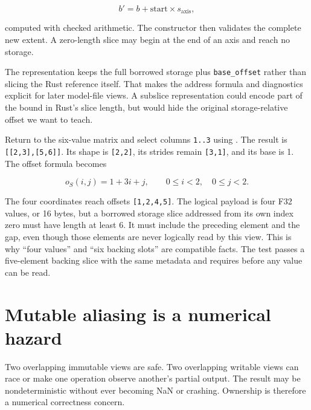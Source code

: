 \begin{equation}
b' = b + \text{start}\times s_{\text{axis}},
\end{equation}

computed with checked arithmetic. The constructor then validates the
complete new extent. A zero-length slice may begin at the end of an axis
and reach no storage.

The representation keeps the full borrowed storage plus
\texttt{base\_offset} rather than slicing the Rust reference itself.
That makes the address formula and diagnostics explicit for later
model-file views. A subslice representation could encode part of the
bound in Rust's slice length, but would hide the original
storage-relative offset we want to teach.


Return to the six-value matrix and select columns \texttt{1..3} using
\texttt{}. The result is
\texttt{{[}{[}2,3{]},{[}5,6{]}{]}}. Its shape is \texttt{{[}2,2{]}}, its
strides remain \texttt{{[}3,1{]}}, and its base is 1. The offset formula
becomes

\begin{equation}
o_S(i,j)=1+3i+j,\qquad 0\le i<2,\quad 0\le j<2.
\end{equation}

The four coordinates reach offsets \texttt{{[}1,2,4,5{]}}. The logical
payload is four F32 values, or 16 bytes, but a borrowed storage slice
addressed from its own index zero must have length at least 6. It must
include the preceding element and the gap, even though those elements
are never logically read by this view. This is why ``four values'' and
``six backing slots'' are compatible facts. The test passes a
five-element backing slice with the same metadata and requires
\texttt{} before any value can be read.

\section{Mutable aliasing is a numerical
hazard}\label{mutable-aliasing-is-a-numerical-hazard}

Two overlapping immutable views are safe. Two overlapping writable views
can race or make one operation observe another's partial output. The
result may be nondeterministic without ever becoming NaN or crashing.
Ownership is therefore a numerical correctness concern.

